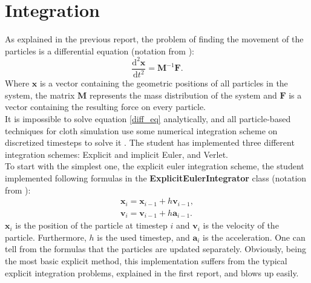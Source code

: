 \ifx\isEmbedded\undefined

\graphicspath{{../img/}}

\tableofcontents
\pagebreak

\fi

\section{Integration} \label{sec_integrate}
As explained in the previous report, the problem of finding the movement of the particles is a differential equation (notation from \citep{baraff_implicit}): 
\begin{equation}\label{diff_eq}
\frac{\mathrm{d}^2 \textbf{x}}{\mathrm{d}t^2} = \textbf{M}^{-1} \textbf{F}.
\end{equation}
Where $\textbf{x}$ is a vector containing the geometric positions of all particles in the system, the matrix $\textbf{M}$ represents the mass distribution of the system and $\textbf{F}$ is a vector containing the resulting force on every particle.\\

It is impossible to solve equation \eqref{diff_eq} analytically, and all particle-based techniques for cloth simulation use some numerical integration scheme on discretized timesteps to solve it \citep{provot_model, bridson_2002, robust_friction_2007}. The student has implemented three different integration schemes: Explicit and implicit Euler, and Verlet.\\

To start with the simplest one, the explicit euler integration scheme, the student implemented following formulas in the {\bf ExplicitEulerIntegrator} class (notation from \citep{provot_model}):
\begin{equation} \label{forw_euler}
\begin{aligned}
\textbf{x}_i = \textbf{x}_{i-1} + h \textbf{v}_{i-1},\\
\textbf{v}_i = \textbf{v}_{i-1} + h \textbf{a}_{i-1}.
\end{aligned}
\end{equation}
$\textbf{x}_i$ is the position of the particle at timestep $i$ and $\textbf{v}_i$ is the velocity of the particle. Furthermore, $h$ is the used timestep, and $\textbf{a}_{i}$ is the acceleration. One can tell from the formulas that the particles are updated separately. Obviously, being the most basic explicit method, this implementation suffers from the typical explicit integration problems, explained in the first report, and blows up easily.\\

